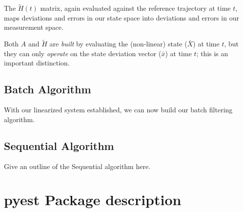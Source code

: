 \documentclass[10pt]{article}
\begin{document}
The $\tilde{H}(t)$ matrix, again evaluated against the reference trajectory at time $t$, maps deviations and errors in our state space into deviations and errors in our measurement space. 

Both $A$ and $\tilde{H}$ are \emph{built} by evaluating the (non-linear) state ($\bar{X}$) at time $t$, but they can only \emph{operate} on the state deviation vector ($\bar{x}$) at time $t$; this is an important distinction.

\subsection{Batch Algorithm}

With our linearized system established, we can now build our batch filtering algorithm.

\subsection{Sequential Algorithm}
Give an outline of the Sequential algorithm here.

\section{\textbf{pyest} Package description}
\end{document}
